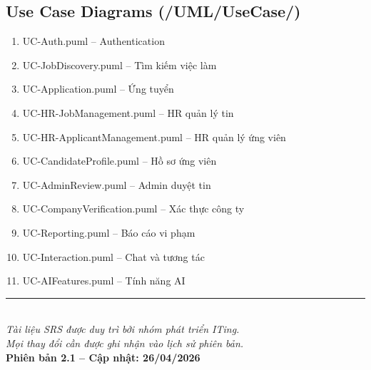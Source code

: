 \documentclass[12pt, a4paper]{report}
\begin{document}
\subsection{Use Case Diagrams (/UML/UseCase/)}
\begin{enumerate}
    \item UC-Auth.puml -- Authentication
    \item UC-JobDiscovery.puml -- Tìm kiếm việc làm
    \item UC-Application.puml -- Ứng tuyển
    \item UC-HR-JobManagement.puml -- HR quản lý tin
    \item UC-HR-ApplicantManagement.puml -- HR quản lý ứng viên
    \item UC-CandidateProfile.puml -- Hồ sơ ứng viên
    \item UC-AdminReview.puml -- Admin duyệt tin
    \item UC-CompanyVerification.puml -- Xác thực công ty
    \item UC-Reporting.puml -- Báo cáo vi phạm
    \item UC-Interaction.puml -- Chat và tương tác
    \item UC-AIFeatures.puml -- Tính năng AI
\end{enumerate}

\bigskip
\begin{center}
\rule{0.5\linewidth}{0.4pt}\\[0.3cm]
\textit{Tài liệu SRS được duy trì bởi nhóm phát triển ITing.}\\
\textit{Mọi thay đổi cần được ghi nhận vào lịch sử phiên bản.}\\[0.2cm]
\textbf{Phiên bản 2.1 -- Cập nhật: 26/04/2026}
\end{center}
\end{document}
